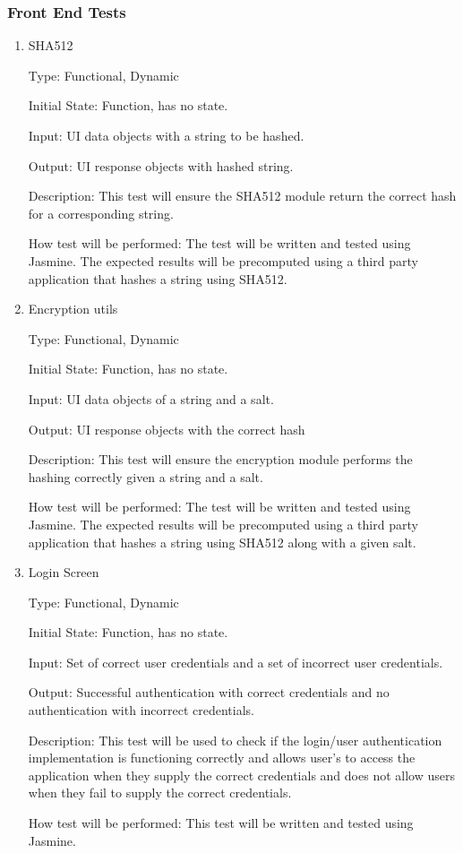 \documentclass[12pt, titlepage]{article}
\begin{document}
  \subsubsection{Front End Tests}
    \begin{enumerate}

      \item{SHA512\\}

      Type: Functional, Dynamic

      Initial State: Function, has no state.

      Input: UI data objects with a string to be hashed.

      Output: UI response objects with hashed string.

      Description: This test will ensure the SHA512 module return the correct
        hash for a corresponding string.

      How test will be performed: The test will be written and tested using
        Jasmine. The expected results will be precomputed using a third party
        application that hashes a string using SHA512.

      \item{Encryption utils\\}

      Type: Functional, Dynamic

      Initial State: Function, has no state.

      Input: UI data objects of a string and a salt.

      Output: UI response objects with the correct hash

      Description: This test will ensure the encryption module performs the
        hashing correctly given a string and a salt.

      How test will be performed: The test will be written and tested using
        Jasmine. The expected results will be precomputed using a third party
        application that hashes a string using SHA512 along with a given salt.

      \item{Login Screen\\}

      Type: Functional, Dynamic

      Initial State: Function, has no state.

      Input: Set of correct user credentials and a set of incorrect user credentials.

      Output: Successful authentication with correct credentials and no
          authentication with incorrect credentials.
                
      Description: This test will be used to check if the login/user authentication
          implementation is functioning correctly and allows user's to access the
          application when they supply the correct credentials and does not allow
          users when they fail to supply the correct credentials.
                

      How test will be performed: This test will be written and tested using Jasmine.

    \end{enumerate}
\end{document}
